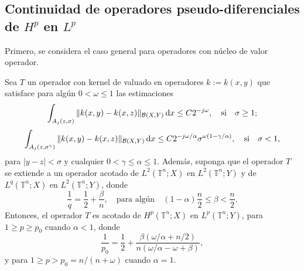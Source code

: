 \subsection{Continuidad de operadores pseudo-diferenciales de $H^p$ en $L^p$}
\label{section:Hp-Lp}
Primero, se considera el caso general para operadores con núcleo de valor operador. 
\begin{theorem}
	\label{theo:operator-kernel-2j}
	Sea $T$ un operador con kernel de valuado en operadores $k:=k(x,y)$ que satisface para algún $0<\omega\leq1$ las estimaciones
	\begin{equation}
		\int_{A_j(z, \sigma)} \| k(x, y) - k(x, z)\|_{\mathcal{B}(X, Y)} \mathop{}\!\mathrm{d} x \leq C2^{-j\omega}, \quad \text{si} \quad \sigma\geq1;
	\end{equation}
	\begin{equation}
		\int_{A_j(z, \sigma^\gamma)} \| k(x, y) - k(x, z)\|_{\mathcal{B}(X,Y)} \mathop{}\!\mathrm{d} x \leq C2^{-j\omega/\alpha}\sigma^{\omega(1-\gamma/\alpha)}, \quad \text{si} \quad \sigma<1,
	\end{equation}
	para $|y-z|<\sigma$ y cualquier $0<\gamma\leq\alpha\leq1$. Además, suponga que el operador $T$ se extiende a un operador acotado de $L^2(\mathbb{T}^n; X)$ en $L^2(\mathbb{T}^n; Y)$ y de $L^q(\mathbb{T}^n; X)$ en $L^2(\mathbb{T}^n; Y)$, donde 
	\begin{equation}
		\frac{1}{q} = \frac{1}{2} + \frac{\beta}{n}, \quad \text{para algún} \quad (1-\alpha)\frac{n}{2} \leq \beta < \frac{n}{2}.
	\end{equation}
	Entonces, el operador $T$ es acotado de $H^p(\mathbb{T}^n; X)$ en $L^p(\mathbb{T}^n;Y)$, para $1\geq p \geq p_0$ cuando $\alpha<1$, donde
	\begin{equation*}
		\frac{1}{p_0} = \frac{1}{2}+\frac{\beta(\omega/\alpha + n/2)}{n(\omega/\alpha-\omega+\beta)},
	\end{equation*}  
	y para $1\geq p > p_0=n/(n+\omega)$ cuando $\alpha=1$.
\end{theorem}
